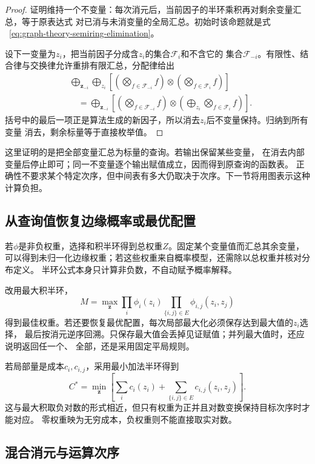 \begin{proof}
证明维持一个不变量：每次消元后，当前因子的半环乘积再对剩余变量汇总，等于原表达式
对已消与未消变量的全局汇总。初始时该命题就是式
~\eqref{eq:graph-theory-semiring-elimination}。

设下一变量为\(z_i\)，把当前因子分成含\(z_i\)的集合\(\mathcal{F}_i\)和不含它的
集合\(\mathcal{F}_{-i}\)。有限性、结合律与交换律允许重排有限汇总，分配律给出
\begin{align*}
  &\bigoplus_{\bm{z}_{-i}}\bigoplus_{z_i}\left[
    \left(\bigotimes_{f\in\mathcal{F}_{-i}}f\right)
    \otimes
    \left(\bigotimes_{f\in\mathcal{F}_i}f\right)
  \right]\\
  &\quad=\bigoplus_{\bm{z}_{-i}}\left[
    \left(\bigotimes_{f\in\mathcal{F}_{-i}}f\right)
    \otimes
    \left(
      \bigoplus_{z_i}
      \bigotimes_{f\in\mathcal{F}_i}f
    \right)
  \right].
\end{align*}
括号中的最后一项正是算法生成的新因子，所以消去\(z_i\)后不变量保持。归纳到所有变量
消去，剩余标量等于直接枚举值。
\end{proof}

这里证明的是把全部变量汇总为标量的查询。若输出保留某些变量，
在消去内部变量后停止即可；同一不变量逐个输出赋值成立，因而得到原查询的函数表。
正确性不要求某个特定次序，但中间表有多大仍取决于次序。下一节将用图表示这种计算负担。

\subsection{从查询值恢复边缘概率或最优配置}

若\(\phi\)是非负权重，选择和积半环得到总权重\(Z\)。固定某个变量值而汇总其余变量，
可以得到未归一化边缘权重；若这些权重来自概率模型，还需除以总权重并核对分布定义。
半环公式本身只计算非负数，不自动赋予概率解释。

改用最大积半环，
\[
  M=\max_{\bm{z}}\prod_i\phi_i(z_i)
  \prod_{\{i,j\}\in E}\phi_{i,j}(z_i,z_j)
\]
得到最佳权重。若还要恢复最优配置，每次局部最大化必须保存达到最大值的\(z_i\)选择，
最后按消元逆序回溯。只保存最大值会丢掉见证赋值；并列最大值时，还应说明返回任一个、
全部，还是采用固定平局规则。

若局部量是成本\(c_i,c_{i,j}\)，采用最小加法半环得到
\[
  C^*=\min_{\bm{z}}\left[
    \sum_i c_i(z_i)+\sum_{\{i,j\}\in E}c_{i,j}(z_i,z_j)
  \right].
\]
这与最大积取负对数的形式相近，但只有权重为正并且对数变换保持目标次序时才能对应。
零权重映为无穷成本，负权重则不能直接取实对数。

\subsection{混合消元与运算次序}

